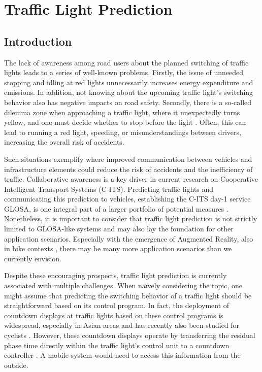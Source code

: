 \chapter{Traffic Light Prediction}\label{ch:prediction}

\section{Introduction}

The lack of awareness among road users about the planned switching of traffic lights leads to a series of well-known problems. Firstly, the issue of unneeded stopping and idling at red lights unnecessarily increases energy expenditure and emissions. In addition, not knowing about the upcoming traffic light's switching behavior also has negative impacts on road safety. Secondly, there is a so-called dilemma zone when approaching a traffic light, where it unexpectedly turns yellow, and one must decide whether to stop before the light \cite{zhang_yellow_2014, suzuki_new_2018}. Often, this can lead to running a red light, speeding, or misunderstandings between drivers, increasing the overall risk of accidents.

Such situations exemplify where improved communication between vehicles and infrastructure elements could reduce the risk of accidents and the inefficiency of traffic. Collaborative awareness is a key driver in current research on Cooperative Intelligent Transport Systems (C-ITS). Predicting traffic lights and communicating this prediction to vehicles, establishing the C-ITS day-1 service GLOSA, is one integral part of a larger portfolio of potential measures \cite{mellegard_day_2020}. Nonetheless, it is important to consider that traffic light prediction is not strictly limited to GLOSA-like systems and may also lay the foundation for other application scenarios. Especially with the emergence of Augmented Reality, also in bike contexts \cite{matviienko_bikear_2022, kosch_notibike_2022}, there may be many more application scenarios than we currently envision.

Despite these encouraging prospects, traffic light prediction is currently associated with multiple challenges. When naïvely considering the topic, one might assume that predicting the switching behavior of a traffic light should be straightforward based on its control program. In fact, the deployment of countdown displays at traffic lights based on these control programs is widespread, especially in Asian areas \cite{pan_impact_2023} and has recently also been studied for cyclists \cite{kaths_green_2019}. However, these countdown displays operate by transferring the residual phase time directly within the traffic light's control unit to a countdown controller \cite{islam_improved_2016}. A mobile system would need to access this information from the outside.

